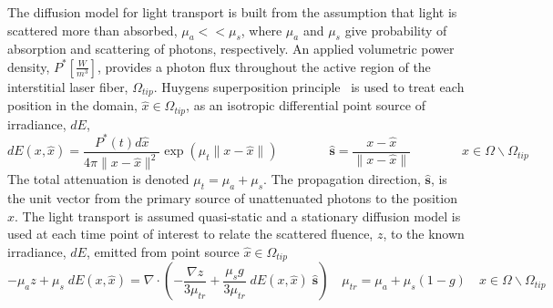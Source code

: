 \documentclass{article}
\begin{document}
The diffusion model for light transport is built from the
assumption that light is scattered more than absorbed, $ \mu_a <<
\mu_s 
$, where $\mu_a$ and $\mu_s $ give probability of absorption and
scattering of photons, respectively.  An applied volumetric power
density, $P^* \left[\frac{W}{m^3}\right]$, provides a photon flux
throughout the active region of the interstitial laser fiber,
$\Omega_{tip}$.  Huygens superposition principle~\cite{Dickey04} is
used to treat each position in the domain, $\hat{x}\in
\Omega_{tip}$, as an isotropic  differential point source of
irradiance, $dE$,
\[
dE(x,\hat{x})= 
             \frac{P^*(t)d\hat{x}}{4\pi 
    \| x - \hat{ x}\|^2}
             \exp\left(\mu_t
                         \| x - \hat{ x }\|\right) 
\qquad \qquad
\hat{\textbf{s}} = 
\frac{ x - \hat{ x }}{ \| x - \hat{ x}\| }
\qquad \qquad
x \in \Omega \backslash \Omega_{tip}
\]
The total attenuation is denoted $\mu_t  = {\mu_a} + {\mu_s}$.  The
propagation direction, $\hat{\textbf{s}}$, is the unit vector from
the primary source of unattenuated photons to the position $x$.
The light transport is assumed quasi-static and a stationary
diffusion model is used at each time point of interest to relate
the scattered fluence, $z$, to the known irradiance, $dE$, emitted
from point source $\hat{x} \in \Omega_{tip}$
%
%
%
%
%
%
\begin{equation} \label{odaLTE}
 -{\mu_a} z 
 +{\mu_s} \; dE(x,\hat{x})
 = \nabla \cdot 
   \left( 
   - \frac{ \nabla z }{3\mu_{tr}} 
   + \frac{ {\mu_s} g }{3\mu_{tr}}
      \; dE(x,\hat{x}) \; \hat{\textbf{s}}
   \right)
\quad
  \mu_{tr}  = 
                 {\mu_a} + 
                    {\mu_s} (1-g)
\quad
x \in \Omega \backslash \Omega_{tip}
\end{equation}
\end{document}
